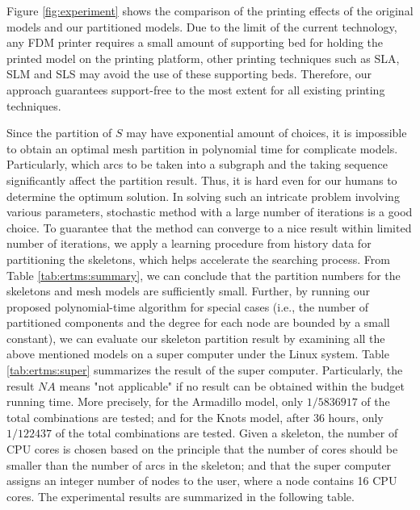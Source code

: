 Figure \ref{fig:experiment} shows the comparison of the printing effects of the original models and our partitioned models. Due to the limit of the current technology, any FDM printer requires a small amount of supporting bed for holding the printed model on the printing platform, other printing techniques such as SLA, SLM and SLS may avoid the use of these supporting beds. Therefore, our approach guarantees support-free to the most extent for all existing printing techniques.

Since the partition of $S$ may have exponential amount of choices, it is impossible to obtain an optimal mesh partition in polynomial time for complicate models. Particularly, which arcs to be taken into a subgraph and the taking sequence significantly affect the partition result. Thus, it is hard even for our humans to determine the optimum solution. In solving such an intricate problem involving various parameters, stochastic method with a large number of iterations is a good choice. To guarantee that the method can converge to a nice result within limited number of iterations, {\color{blue}we apply a learning procedure from history data for partitioning the skeletons}, which helps accelerate the searching process. From Table \ref{tab:ertms:summary}, we can conclude that the partition numbers for the skeletons and mesh models are sufficiently small. Further, by running our proposed polynomial-time algorithm for special cases (i.e., the number of partitioned components and the degree for each node are bounded by a small constant), we can evaluate our skeleton partition result by examining all the above mentioned models on a super computer under the Linux system. Table \ref{tab:ertms:super} summarizes the result of the super computer. Particularly, the result $NA$ means "not applicable" if no result can be obtained within the budget running time. More precisely, for the Armadillo model, only $1/5836917$ of the total combinations are tested; and for the Knots model, after 36 hours, only $1/122437$ of the total combinations are tested. Given a skeleton, the number of CPU cores is chosen based on the principle that the number of cores should be smaller than the number of arcs in the skeleton; and that the super computer assigns an integer number of nodes to the user, where a node contains 16 CPU cores. The experimental results are summarized in the following table.

